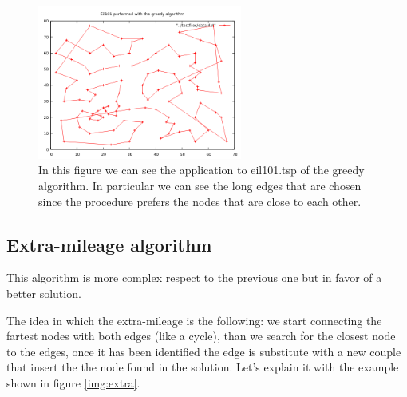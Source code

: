 \begin{figure}
	\label{img:greedy}
	\centering
	\includegraphics[width=0.6\textwidth]{images/eil101_greedy}
	\caption{In this figure we can see the application to eil101.tsp of the greedy algorithm. In particular we can see the long edges that are chosen since the procedure prefers the nodes that are close to each other.}
\end{figure}

\subsection{Extra-mileage algorithm}
This algorithm is more complex respect to the previous one but in favor of a better solution.

The idea in which the extra-mileage is the following: we start connecting the fartest nodes with both edges (like a cycle), than we search for the closest node to the edges, once it has been identified the edge is substitute with a new couple that insert the the node found in the solution. Let's explain it with the example shown in figure \ref{img:extra}.

